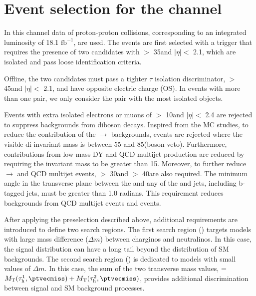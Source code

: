 \section{\texorpdfstring{Event selection for the \tauTau channel}{Event selection for the tau-tau channel}}
\label{sect:tauTauCuts}
In this channel data of proton-proton collisions,  corresponding to an integrated luminosity of 18.1 $\mathrm{fb}^{-1}$, are used.
The events are first selected with a trigger \cite{Chatrchyan:2011nv} that requires the presence of
two \Tau candidates with \PT $>$ 35\GeV and $|\eta|<$ 2.1, which are isolated and pass loose identification criteria.

Offline, %
the two \Tau candidates must pass a tighter $\tau$ isolation discriminator,
\PT $>$ 45\GeV and $|\eta|<$ 2.1, and have opposite electric charge (OS).
In events with more than one \tauTau pair, we only consider the pair with the most isolated \Tau objects. 

Events with extra isolated electrons or muons of \PT $>$ 10\GeV and $|\eta| <$ 2.4 
are rejected to suppress %
backgrounds from diboson decays.
Inspired from the MC studies, to reduce the contribution of the \Z$ \rightarrow$ \tauTau backgrounds, events are  rejected where the visible
di-\Tau invariant mass is between 55 and 85\GeV (\Z boson veto).  
Furthermore, contributions from low-mass DY and QCD multijet production are 
reduced by requiring the invariant mass to be greater than 15\GeV.
Moreover, to further reduce \Z $\rightarrow$ \tauTau and QCD multijet events, %
\MPT $>$ 30\GeV and \mttwo $>$ 40\GeV are also required.
The minimum angle \deltaphi in the transverse plane between the \ptvecmiss and any of the \Tau and jets, 
including b-tagged jets, must be greater than 1.0 radians. 
This requirement reduces backgrounds from QCD multijet events and \wjets events.

After applying the preselection described above,
additional requirements are introduced to define two search regions.
The first search region (\binone) targets models with large mass difference ($\Delta m$) 
between charginos and neutralinos.
In this case, the \mttwo signal distribution can have a long tail beyond the 
distribution of SM backgrounds.
The second search region (\bintwo) is dedicated to models with small values of $\Delta m$.
In this case, the sum of the two transverse mass values, \SumMT = $\mt(\Tau^1,\ptvecmiss) + \mt(\Tau^2,\ptvecmiss)$, 
provides additional discrimination between signal and SM background processes.

